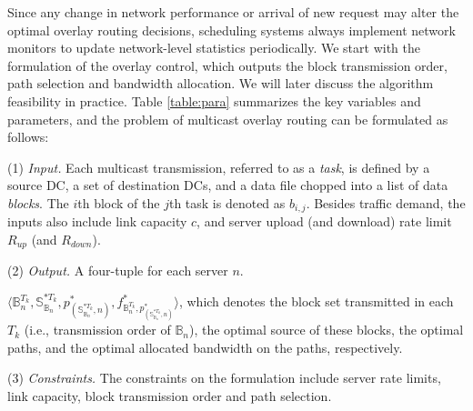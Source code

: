 Since any change in network performance or arrival of
new request may alter the optimal overlay
routing decisions, scheduling systems always implement network monitors to update network-level statistics periodically. We start with the formulation of the overlay control, which outputs the block transmission order, path selection and bandwidth allocation. We will later discuss the algorithm feasibility in practice.
Table \ref{table:para} summarizes the key variables and parameters, and the problem of multicast overlay routing can be formulated as follows:


\noindent(1) {\em Input.} %
Each multicast transmission, referred to as a {\em task}, is defined
by a source DC, a set of destination DCs, and a data file chopped into
a list of data {\em blocks}.
The $i$th block of the $j$th task is denoted as $b_{i,j}$. Besides traffic demand, the inputs also include link capacity $c$, and
server upload (and download) rate limit $R_{up}$ (and $R_{down}$).

\noindent(2) {\em Output.} A four-tuple for each server $n$.

$\langle \mathbb{B}^{T_k}_n, \mathbb{S}_{\mathbb{B}_n}^{*T_k}, p^*_{(\mathbb{S}_{\mathbb{B}_n}^{*T_k},n)}, f^*_{\mathbb{B}^{T_k}_n,p^*_{(\mathbb{S}_{\mathbb{B}_n}^{*T_k},n)}} \rangle$, which denotes the block set transmitted in each $T_k$ (i.e., transmission order of $\mathbb{B}_n$), the optimal source of these blocks, the optimal paths, and the optimal allocated bandwidth on the paths, respectively.

\noindent(3) {\em Constraints.}
The constraints on the formulation include server rate limits, link capacity, block transmission order and path selection.

